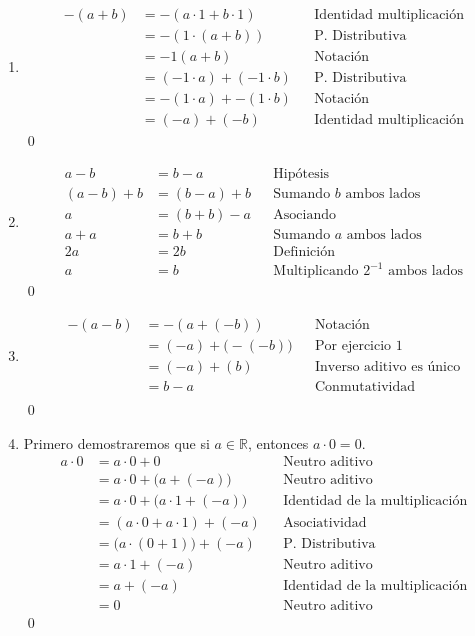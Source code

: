 \documentclass[11pt]{article}
\newcommand{\R}{\mathbb{R}}
\begin{document}
\begin{enumerate}

 \item \begin{align*}
  -(a+b) &= -(a\cdot 1 + b \cdot 1) && \text{Identidad multiplicación}\\
  &= -(1 \cdot (a+b)) && \text{P. Distributiva}\\
  &= -1(a+b) && \text{Notación}\\
  &= (-1\cdot a) + (-1\cdot b) && \text{P. Distributiva}\\
  &= -(1\cdot a) + -(1\cdot b) && \text{Notación}\\
  &= (-a) + (-b) && \text{Identidad multiplicación}
 \end{align*} \qed

 \item \begin{align*}
  a-b &= b- a && \text{Hipótesis} \\
  (a-b)+b &= (b-a)+b &&\text{Sumando $b$ ambos lados} \\
  a &= (b+b)-a&&\text{Asociando} \\
  a + a &= b+b &&\text{Sumando $a$ ambos lados} \\
  2a &= 2b &&\text{Definición} \\
  a &= b && \text{Multiplicando $2^{-1}$ ambos lados}
 \end{align*} \qed

 \item \begin{align*}
  -(a-b) &= -(a+(-b)) &&\text{Notación} \\
  &= (-a) + \bigl(-(-b)\bigr) &&\text{Por ejercicio 1} \\
  &= (-a) + (b) &&\text{Inverso aditivo es único} \\
  &= b -a &&\text{Conmutatividad} \\
 \end{align*} \qed

 \item Primero demostraremos que si $a\in \R$, entonces $a\cdot 0=0$.
 \begin{align*}
  a\cdot0&=a\cdot0+0 && \text{Neutro aditivo}\\
  &=a\cdot0+\bigl(a+\left(-a\right)\bigr) && \text{Neutro aditivo}\\
  &=a\cdot0+\bigl(a\cdot1+\left(-a\right)\bigr) && \text{Identidad de la multiplicación}\\
  &=\left(a\cdot0+a\cdot1\right)+\left(-a\right) && \text{Asociatividad}\\
  &=\bigl(a\cdot\left(0+1\right)\bigr)+\left(-a\right) && \text{P. Distributiva}\\
  &=a\cdot1+\left(-a\right) && \text{Neutro aditivo}\\
  &=a+\left(-a\right) && \text{Identidad de la multiplicación}\\
  &=0 && \text{Neutro aditivo}
\end{align*} \qed
 

\end{enumerate}
\end{document}

